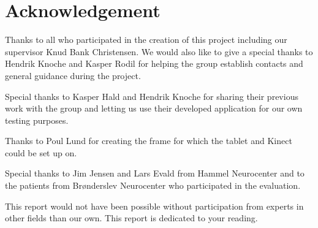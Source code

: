 \chapter*{Acknowledgement}\label{ch:Achknowledgement}

Thanks to all who participated in the creation of this project including our supervisor Knud Bank Christensen.
We would also like to give a special thanks to Hendrik Knoche and Kasper Rodil for helping the group establish contacts and general guidance during the project.

Special thanks to Kasper Hald and Hendrik Knoche for sharing their previous work with the group and letting us use their developed application for our own testing purposes.

Thanks to Poul Lund for creating the frame for which the tablet and Kinect could be set up on.

Special thanks to Jim Jensen and Lars Evald from Hammel Neurocenter and to the patients from Brønderslev Neurocenter who participated in the evaluation. 

This report would not have been possible without participation from experts in other fields than our own. This report is dedicated to your reading. 